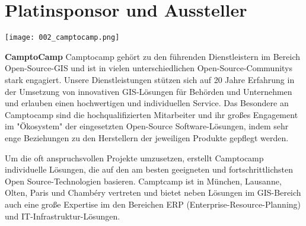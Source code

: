 \section*{Platinsponsor und Aussteller}
  \texttt{[image: 002\_camptocamp.png]}
  \vspace{1.0\baselineskip}
  
\noindent
{\bfseries CamptoCamp} Camptocamp gehört zu den führenden Dienstleistern im Bereich Open-Source-GIS und ist in vielen unterschiedlichen Open-Source-Communitys stark engagiert.
\newpage
\noindent
Unsere Dienstleistungen stützen sich auf 20 Jahre Erfahrung in der Umsetzung von innovativen GIS-Lösungen für Behörden und Unternehmen und erlauben einen hochwertigen und individuellen Service. Das Besondere an Camptocamp sind die hochqualifizierten Mitarbeiter und ihr großes Engagement im "Ökosystem" der eingesetzten Open-Source Software-Lösungen, indem sehr enge Beziehungen zu den Herstellern der jeweiligen Produkte gepflegt werden.

\noindent
Um die oft anspruchsvollen Projekte umzusetzen, erstellt Camptocamp individuelle Lösungen, die auf den am besten geeigneten und fortschrittlichsten Open Source-Technologien basieren. Camptcamp ist in München, Lausanne, Olten, Paris und Chambéry vertreten und bietet neben Lösungen im GIS-Bereich auch eine große Expertise im den Bereichen ERP (Enterprise-Resource-Planning) und IT-Infrastruktur-Lösungen.
